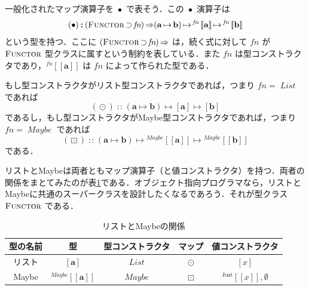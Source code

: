 \documentclass[a4paper,twocolumn]{jsbook}
\def\[{\left[\!\left[}
\def\]{\right]\!\right]}
\DeclareMathOperator{\mSuperClass}{\Rightarrow}
\DeclareMathOperator{\mSuperSet}{\supset}
\newcommand{\mNothing}{\emptyset}
\DeclareMathOperator{\mIn}{{:\!:}}
\DeclareMathOperator{\mMap}{\bullet}
\DeclareMathOperator{\mMapList}{\odot}
\DeclareMathOperator{\mMapMaybe}{\boxdot}
\DeclareMathOperator{\mMapsTo}{\mapsto}
\newcommand{\mType}[1]{\mathbf{#1}}
\newcommand{\mListType}[1]{[\mType{#1}]}
\newcommand{\mTypeConstructor}[1]{\textit{#1}}
\DeclareMathOperator{\mListTypeConstructor}{\mTypeConstructor{List}}
\DeclareMathOperator{\mMaybeTypeConstructor}{\mTypeConstructor{Maybe}}
\newcommand{\mGenericTypeAssemble}[2]{{}^{\mTypeConstructor{#1}}\[\mType{#2}\]}
\newcommand{\mMaybeType}[1]{\mGenericTypeAssemble{Maybe}{#1}}
\newcommand{\mGenericValueConstructor}[1]{\mathrm{#1}}
\newcommand{\mGenericWith}[2]{{}^\mGenericValueConstructor{#1}\[#2\]}
\newcommand{\mJustWith}[1]{\mGenericWith{Just}{#1}}
\newcommand{\mListWith}[1]{\left[#1\right]}
\newcommand{\mGenericTypeClass}[1]{\textsc{#1}} %
\newcommand{\mFunctorTypeClass}{\mGenericTypeClass{Functor}}
\newcommand{\mProj}[2]{#1\mMapsTo#2}
\begin{document}
一般化されたマップ演算子を $\mMap$ で表そう．この $\mMap$ 演算子は
\begin{equation}
(\mMap)\mIn{}(\mFunctorTypeClass\mSuperSet\mTypeConstructor{fn})\mSuperClass\mProj{\mProj{(\mProj{\mType{a}}{\mType{b}})}{\mGenericTypeAssemble{fn}{a}}}{\mGenericTypeAssemble{fn}{b}}
\end{equation}
という型を持つ．ここに $(\mFunctorTypeClass\mSuperSet\mTypeConstructor{fn})\mSuperClass$ は，続く式に対して $\mTypeConstructor{fn}$ が $\mFunctorTypeClass$ 型クラスに属すという制約を表している．また $\mTypeConstructor{fn}$ は型コンストラクタであり，$\mGenericTypeAssemble{fn}{a}$ は $\mTypeConstructor{fn}$ によって作られた型である．

もし型コンストラクタがリスト型コンストラクタであれば，つまり $\mTypeConstructor{fn}=\mListTypeConstructor$ であれば
\begin{equation}
(\mMapList)\mIn{}\mProj{\mProj{(\mProj{\mType{a}}{\mType{b}})}{\mListType{a}}}{\mListType{b}}
\end{equation}
であるし，もし型コンストラクタがMaybe型コンストラクタであれば，つまり $\mTypeConstructor{fn}=\mMaybeTypeConstructor$ であれば
\begin{equation}
(\mMapMaybe)\mIn{}\mProj{\mProj{(\mProj{\mType{a}}{\mType{b}})}{\mMaybeType{a}}}{\mMaybeType{b}}
\end{equation}
である．

リストとMaybeは両者ともマップ演算子（と値コンストラクタ）を持つ．両者の関係をまとてみたのが表\ref{tab:list-and-maybe}である．オブジェクト指向プログラマなら，リストとMaybeに共通のスーパークラスを設計したくなるであろう．それが型クラス $\mFunctorTypeClass$ である．

\begin{table}
\label{tab:list-and-maybe}
\caption{リストとMaybeの関係}
\begin{center}
\begin{tabular}{||c|c|c|c|c||}\hline
型の名前&型&型コンストラクタ&マップ&値コンストラクタ\\\hline\hline
リスト&$\mListType{a}$&$\mListTypeConstructor$&$\mMapList$&$\mListWith{x}$\\
Maybe&$\mMaybeType{a}$&$\mMaybeTypeConstructor$&$\mMapMaybe$&$\mJustWith{x},\mNothing$\\\hline
\end{tabular}
\end{center}
\end{table}

\end{document}
